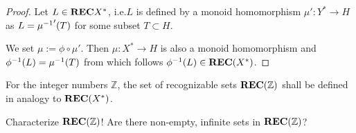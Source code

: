 \begin{proof}
Let $L \in \mbox{{\bf REC}}{X^*}$, i.e.$L$ is defined by a monoid homomorphism
$\mu' : Y^* \to H$ as $L = \mbox{${\mu}^{-1}$}'(T)$ for some subset $T \subset H$.

We set $\mu := \phi \circ \mu'$. Then $\mu : X^* \to H$ is also a monoid
homomorphism and $\mbox{${\phi}^{-1}$}(L) = \mbox{${\mu}^{-1}$}(T)$ from which follows $\mbox{${\phi}^{-1}$}(L)
\in \mbox{{\bf REC}}(X^*)$.
\end{proof}

\bigskip
\begin{exercise}
For the integer numbers $\mathbb{Z}$, the set of recognizable sets
$\mbox{{\bf REC}}(\mathbb{Z})$ shall be defined in analogy to $\mbox{{\bf REC}}(X^*)$.

Characterize $\mbox{{\bf REC}}(\mathbb{Z})$! Are there non-empty, infinite sets in
$\mbox{{\bf REC}}(\mathbb{Z})$?
\end{exercise}
